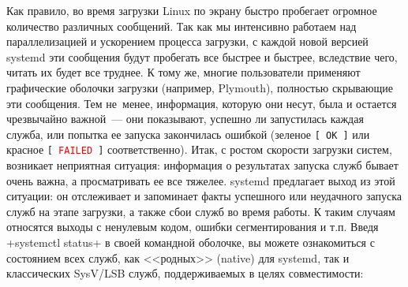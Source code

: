 \documentclass[10pt,oneside,a4paper]{article}
\begin{document}
Как правило, во время загрузки Linux по экрану быстро пробегает огромное
количество различных сообщений. Так как мы интенсивно работаем над
параллелизацией и ускорением процесса загрузки, с каждой новой версией
systemd эти сообщения будут пробегать все быстрее и быстрее, вследствие чего,
читать их будет все труднее. К тому же, многие пользователи применяют
графические оболочки загрузки (например, Plymouth), полностью скрывающие эти
сообщения. Тем не~менее, информация, которую они несут, была и остается
чрезвычайно важной~--- они показывают, успешно ли запустилась каждая служба, или
попытка ее запуска закончилась ошибкой (зеленое
\texttt{[~\textcolor{dgreen}{OK}~]} или красное
\texttt{[~\textcolor{red}{FAILED}~]} соответственно). Итак, с ростом скорости
загрузки систем, возникает неприятная ситуация: информация о результатах
запуска служб бывает очень важна, а просматривать ее все тяжелее. systemd
предлагает выход из этой ситуации: он отслеживает и запоминает факты успешного
или неудачного запуска служб на этапе загрузки, а также сбои служб во время
работы. К таким случаям относятся выходы с ненулевым кодом, ошибки
сегментирования и т.п. Введя +systemctl status+ в своей командной оболочке, вы
можете ознакомиться с состоянием всех служб, как <<родных>> (native) для
systemd, так и классических SysV/LSB служб, поддерживаемых в целях
совместимости: 
\end{document}
